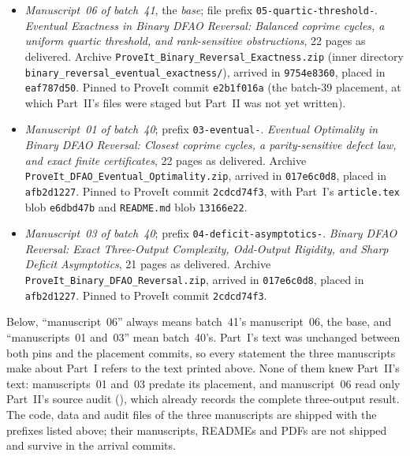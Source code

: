 \documentclass[11pt,a4paper]{article}
\numberwithin{equation}{section}
\theoremstyle{definition}
\theoremstyle{remark}
\begin{document}
\begin{itemize}
\item \emph{Manuscript~06 of batch~41}, the \emph{base}; file prefix
\texttt{05-quartic-threshold-}. \emph{Eventual Exactness in Binary DFAO
Reversal: Balanced coprime cycles, a uniform quartic threshold, and
rank-sensitive obstructions}, 22 pages as delivered. Archive
\texttt{ProveIt\_\allowbreak Binary\_\allowbreak Reversal\_\allowbreak Exactness.zip}
(inner directory
\texttt{binary\_\allowbreak reversal\_\allowbreak eventual\_\allowbreak exactness/}),
arrived in \texttt{9754e8360}, placed in \texttt{eaf787d50}. Pinned to
ProveIt commit \texttt{e2b1f016a} (the batch-39 placement, at which Part~II's
files were staged but Part~II was not yet written).
\item \emph{Manuscript~01 of batch~40}; prefix \texttt{03-eventual-}.
\emph{Eventual Optimality in Binary DFAO Reversal: Closest coprime cycles, a
parity-sensitive defect law, and exact finite certificates}, 22 pages as
delivered. Archive
\texttt{ProveIt\_\allowbreak DFAO\_\allowbreak Eventual\_\allowbreak Optimality.zip},
arrived in \texttt{017e6c0d8}, placed in \texttt{afb2d1227}. Pinned to
ProveIt commit \texttt{2cdcd74f3}, with Part~I's \texttt{article.tex} blob
\texttt{e6dbd47b} and \texttt{README.md} blob \texttt{13166e22}.
\item \emph{Manuscript~03 of batch~40}; prefix
\texttt{04-deficit-asymptotics-}. \emph{Binary DFAO Reversal: Exact
Three-Output Complexity, Odd-Output Rigidity, and Sharp Deficit Asymptotics},
21 pages as delivered. Archive
\texttt{ProveIt\_\allowbreak Binary\_\allowbreak DFAO\_\allowbreak Reversal.zip},
arrived in \texttt{017e6c0d8}, placed in \texttt{afb2d1227}. Pinned to
ProveIt commit \texttt{2cdcd74f3}.
\end{itemize}

Below, ``manuscript~06'' always means batch~41's manuscript~06, the base, and
``manuscripts~01 and~03'' mean batch~40's. Part~I's text was unchanged
between both pins and the placement commits, so every statement the three
manuscripts make about Part~I refers to the text printed above. None of them
knew Part~II's text: manuscripts~01 and~03 predate its placement, and
manuscript~06 read only Part~II's source audit
(), which already records the complete
three-output result. The code, data and audit files of the three manuscripts
are shipped with the prefixes listed above; their manuscripts, READMEs and
PDFs are not shipped and survive in the arrival commits.
\end{document}
